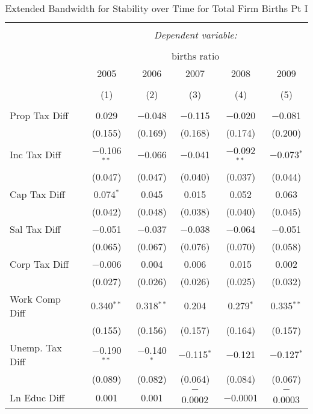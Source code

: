 
\begin{table}[!htbp] \centering 
  \caption{Extended Bandwidth for Stability over Time for  Total Firm Births Pt I} 
  \label{--year_eb} 
\small 
\begin{tabular}{@{\extracolsep{5pt}}lccccc} 
\\[-1.8ex]\hline 
\hline \\[-1.8ex] 
 & \multicolumn{5}{c}{\textit{Dependent variable:}} \\ 
\cline{2-6} 
\\[-1.8ex] & \multicolumn{5}{c}{births ratio} \\ 
 & 2005 & 2006 & 2007 & 2008 & 2009 \\ 
\\[-1.8ex] & (1) & (2) & (3) & (4) & (5)\\ 
\hline \\[-1.8ex] 
 Prop Tax Diff & 0.029 & $-$0.048 & $-$0.115 & $-$0.020 & $-$0.081 \\ 
  & (0.155) & (0.169) & (0.168) & (0.174) & (0.200) \\ 
  Inc Tax Diff & $-$0.106$^{**}$ & $-$0.066 & $-$0.041 & $-$0.092$^{**}$ & $-$0.073$^{*}$ \\ 
  & (0.047) & (0.047) & (0.040) & (0.037) & (0.044) \\ 
  Cap Tax Diff & 0.074$^{*}$ & 0.045 & 0.015 & 0.052 & 0.063 \\ 
  & (0.042) & (0.048) & (0.038) & (0.040) & (0.045) \\ 
  Sal Tax Diff & $-$0.051 & $-$0.037 & $-$0.038 & $-$0.064 & $-$0.051 \\ 
  & (0.065) & (0.067) & (0.076) & (0.070) & (0.058) \\ 
  Corp Tax Diff & $-$0.006 & 0.004 & 0.006 & 0.015 & 0.002 \\ 
  & (0.027) & (0.026) & (0.026) & (0.025) & (0.032) \\ 
  Work Comp Diff & 0.340$^{**}$ & 0.318$^{**}$ & 0.204 & 0.279$^{*}$ & 0.335$^{**}$ \\ 
  & (0.155) & (0.156) & (0.157) & (0.164) & (0.157) \\ 
  Unemp. Tax Diff & $-$0.190$^{**}$ & $-$0.140$^{*}$ & $-$0.115$^{*}$ & $-$0.121 & $-$0.127$^{*}$ \\ 
  & (0.089) & (0.082) & (0.064) & (0.084) & (0.067) \\ 
  Ln Educ Diff & 0.001 & 0.001 & $-$0.0002 & $-$0.0001 & $-$0.0003 \\ 

\end{tabular}
\end{table}
